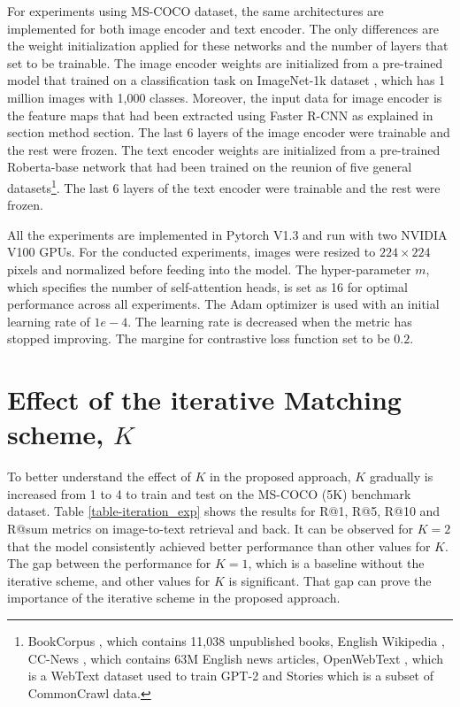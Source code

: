 \documentclass{midl}
\begin{document}
For experiments using MS-COCO dataset, the same architectures are implemented for both image encoder and text encoder. The only differences are the weight initialization applied for these networks and the number of layers that set to be trainable. The image encoder weights are initialized from a pre-trained model that trained on a classification task on ImageNet-1k dataset \cite{deng2009imagenet}, which has 1 million images with 1,000 classes. Moreover, the input data for image encoder is the feature maps that had been extracted using Faster R-CNN 
as explained in section method section. The last 6 layers of the image encoder were trainable and the rest were frozen. The text encoder weights are initialized from a pre-trained Roberta-base network that had been trained on the reunion of five general datasets\footnote{BookCorpus \cite{Homembwe2:online}, which contains 11,038 unpublished books, English Wikipedia \cite{EnglishW87:online}, CC-News \cite{NewsData24:online}, which contains 63M English news articles, OpenWebText \cite{GitHubjc79:online}, which is a WebText dataset used to train GPT-2 and Stories which is a subset of CommonCrawl \cite{NewsData14:online} data.}. The last 6 layers of the text encoder were trainable and the rest were frozen.

All the experiments are implemented in Pytorch V1.3 and run with two NVIDIA V100 GPUs. For the conducted experiments, images were resized to $224 \times 224$ pixels and normalized before feeding into the model. The hyper-parameter $m$, which specifies the number of self-attention heads, is set as 16 for optimal performance across all experiments. The Adam optimizer \cite{kingma2014adam} is used with an initial learning rate of $1e-4$. The learning rate is decreased when the metric has stopped improving. The margine for contrastive loss function set to be $0.2$.

\section{Effect of the iterative Matching scheme, $K$} \label{appd} To better understand the effect of $K$ in the proposed approach, $K$ gradually is increased from 1 to 4 to train and test on the MS-COCO (5K) benchmark dataset. Table \ref{table-iteration_exp} shows the results for R@1, R@5, R@10 and R@sum metrics on image-to-text retrieval and back. It can be observed for $K=2$ that the model consistently achieved better performance than other values for $K$. The gap between the performance for $K=1$,  which is a baseline without the iterative scheme, and other values for $K$ is significant. That gap can prove the importance of the iterative scheme in the proposed approach.
\end{document}
